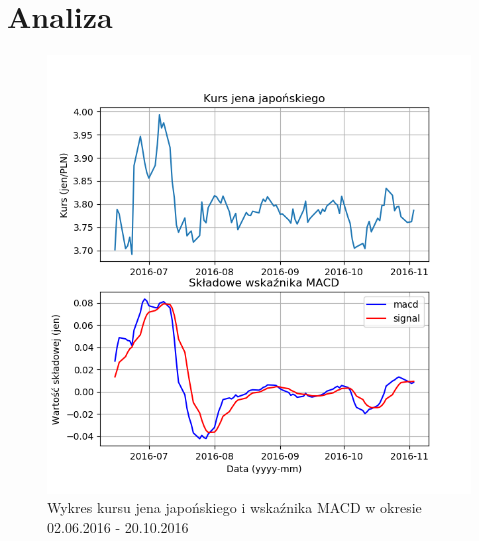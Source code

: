 \documentclass{article} %
\begin{document}
\newpage

\section{Analiza}

\begin{figure}[h]
    \centering
    \includegraphics[scale=0.7]{images/wykres_bez_ulepszenia.png}
    \caption{Wykres kursu jena japońskiego i wskaźnika MACD w okresie 02.06.2016 - 20.10.2016}
\end{figure}
\end{document}
